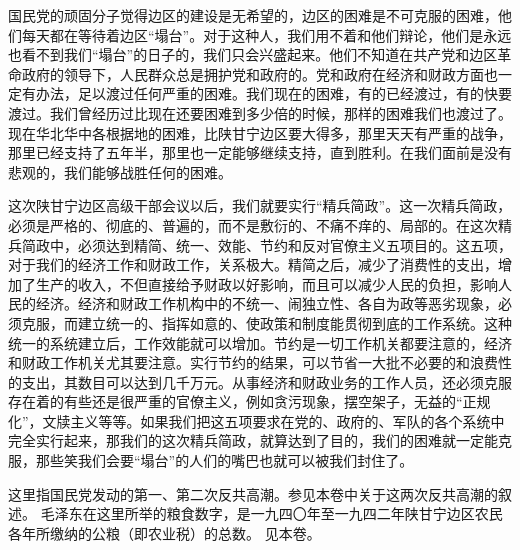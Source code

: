 国民党的顽固分子觉得边区的建设是无希望的，边区的困难是不可克服的困难，他们每天都在等待着边区“塌台”。对于这种人，我们用不着和他们辩论，他们是永远也看不到我们“塌台”的日子的，我们只会兴盛起来。他们不知道在共产党和边区革命政府的领导下，人民群众总是拥护党和政府的。党和政府在经济和财政方面也一定有办法，足以渡过任何严重的困难。我们现在的困难，有的已经渡过，有的快要渡过。我们曾经历过比现在还要困难到多少倍的时候，那样的困难我们也渡过了。现在华北华中各根据地的困难，比陕甘宁边区要大得多，那里天天有严重的战争，那里已经支持了五年半，那里也一定能够继续支持，直到胜利。在我们面前是没有悲观的，我们能够战胜任何的困难。

这次陕甘宁边区高级干部会议以后，我们就要实行“精兵简政”。这一次精兵简政，必须是严格的、彻底的、普遍的，而不是敷衍的、不痛不痒的、局部的。在这次精兵简政中，必须达到精简、统一、效能、节约和反对官僚主义五项目的。这五项，对于我们的经济工作和财政工作，关系极大。精简之后，减少了消费性的支出，增加了生产的收入，不但直接给予财政以好影响，而且可以减少人民的负担，影响人民的经济。经济和财政工作机构中的不统一、闹独立性、各自为政等恶劣现象，必须克服，而建立统一的、指挥如意的、使政策和制度能贯彻到底的工作系统。这种统一的系统建立后，工作效能就可以增加。节约是一切工作机关都要注意的，经济和财政工作机关尤其要注意。实行节约的结果，可以节省一大批不必要的和浪费性的支出，其数目可以达到几千万元。从事经济和财政业务的工作人员，还必须克服存在着的有些还是很严重的官僚主义，例如贪污现象，摆空架子，无益的“正规化”，文牍主义等等。如果我们把这五项要求在党的、政府的、军队的各个系统中完全实行起来，那我们的这次精兵简政，就算达到了目的，我们的困难就一定能克服，那些笑我们会要“塌台”的人们的嘴巴也就可以被我们封住了。


\begin{maonote}
这里指国民党发动的第一、第二次反共高潮。参见本卷中关于这两次反共高潮的叙述。
毛泽东在这里所举的粮食数字，是一九四〇年至一九四二年陕甘宁边区农民各年所缴纳的公粮（即农业税）的总数。
见本卷。
\end{maonote}
